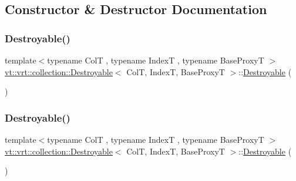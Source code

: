 \subsection{Constructor \& Destructor Documentation}
\mbox{\label{structvt_1_1vrt_1_1collection_1_1_destroyable_a1fd3bd7880c42a7e856dae61358a7e2d}} 
\subsubsection{\texorpdfstring{Destroyable()}{Destroyable()}\hspace{0.1cm}{\footnotesize\ttfamily [1/4]}}
{\footnotesize\ttfamily template$<$typename ColT , typename IndexT , typename Base\+ProxyT $>$ \\
\hyperlink{structvt_1_1vrt_1_1collection_1_1_destroyable}{vt\+::vrt\+::collection\+::\+Destroyable}$<$ ColT, IndexT, Base\+ProxyT $>$\+::\hyperlink{structvt_1_1vrt_1_1collection_1_1_destroyable}{Destroyable} (\begin{DoxyParamCaption}{ }\end{DoxyParamCaption})\hspace{0.3cm}{\ttfamily [default]}}

\mbox{\label{structvt_1_1vrt_1_1collection_1_1_destroyable_ac456d507cd1f88578102e9c142950583}} 
\subsubsection{\texorpdfstring{Destroyable()}{Destroyable()}\hspace{0.1cm}{\footnotesize\ttfamily [2/4]}}
{\footnotesize\ttfamily template$<$typename ColT , typename IndexT , typename Base\+ProxyT $>$ \\
\hyperlink{structvt_1_1vrt_1_1collection_1_1_destroyable}{vt\+::vrt\+::collection\+::\+Destroyable}$<$ ColT, IndexT, Base\+ProxyT $>$\+::\hyperlink{structvt_1_1vrt_1_1collection_1_1_destroyable}{Destroyable} (\begin{DoxyParamCaption}\item[{\hyperlink{structvt_1_1vrt_1_1collection_1_1_destroyable}{Destroyable}$<$ ColT, IndexT, Base\+ProxyT $>$ const \&}]{ }\end{DoxyParamCaption})\hspace{0.3cm}{\ttfamily [default]}}

